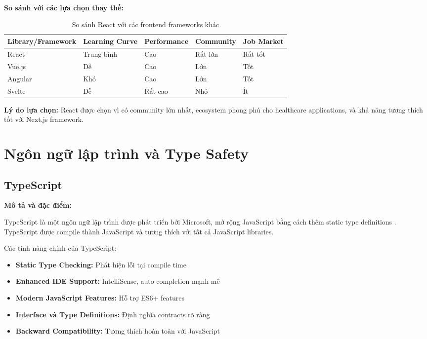 \documentclass[../DoAn.tex]{subfiles}
\begin{document}
\textbf{So sánh với các lựa chọn thay thế:}

\begin{table}[H]
\centering
\begin{tabular}{|p{2.5cm}|p{2.5cm}|p{2.5cm}|p{2.5cm}|p{2.5cm}|}
\hline
\textbf{Library/Framework} & \textbf{Learning Curve} & \textbf{Performance} & \textbf{Community} & \textbf{Job Market} \\
\hline
React & Trung bình & Cao & Rất lớn & Rất tốt \\
\hline
Vue.js & Dễ & Cao & Lớn & Tốt \\
\hline
Angular & Khó & Cao & Lớn & Tốt \\
\hline
Svelte & Dễ & Rất cao & Nhỏ & Ít \\
\hline
\end{tabular}
\caption{So sánh React với các frontend frameworks khác}
\end{table}

\textbf{Lý do lựa chọn:} React được chọn vì có community lớn nhất, ecosystem phong phú cho healthcare applications, và khả năng tương thích tốt với Next.js framework.

\section{Ngôn ngữ lập trình và Type Safety}
\label{section:3.2}

\subsection{TypeScript}
\label{subsection:3.2.1}

\textbf{Mô tả và đặc điểm:}

TypeScript là một ngôn ngữ lập trình được phát triển bởi Microsoft, mở rộng JavaScript bằng cách thêm static type definitions \cite{typescript}. TypeScript được compile thành JavaScript và tương thích với tất cả JavaScript libraries.

Các tính năng chính của TypeScript:
\begin{itemize}
    \item \textbf{Static Type Checking:} Phát hiện lỗi tại compile time
    \item \textbf{Enhanced IDE Support:} IntelliSense, auto-completion mạnh mẽ
    \item \textbf{Modern JavaScript Features:} Hỗ trợ ES6+ features
    \item \textbf{Interface và Type Definitions:} Định nghĩa contracts rõ ràng
    \item \textbf{Backward Compatibility:} Tương thích hoàn toàn với JavaScript
\end{itemize}
\end{document}
